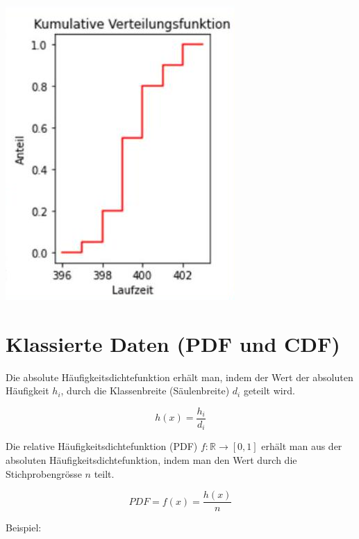 \documentclass[10pt]{article}
\begin{document}
\begin{center}
\includegraphics[max width=\textwidth]{2024_12_29_e932069dd64ad17e4875g-02}
\end{center}

\section*{Klassierte Daten (PDF und CDF)}
Die absolute Häufigkeitsdichtefunktion erhält man, indem der Wert der absoluten Häufigkeit $h_{i}$, durch die Klassenbreite (Säulenbreite) $d_{i}$ geteilt wird.

$$
h(x)=\frac{h_{i}}{d_{i}}
$$

Die relative Häufigkeitsdichtefunktion (PDF) $f: \mathbb{R} \rightarrow[0,1]$ erhält man aus der absoluten Häufigkeitsdichtefunktion, indem man den Wert durch die Stichprobengrösse $n$ teilt.

$$
P D F=f(x)=\frac{h(x)}{n}
$$

Beispiel:
\end{document}
